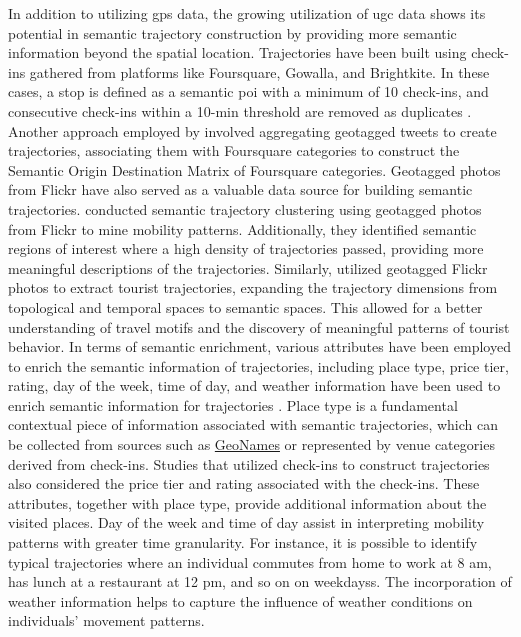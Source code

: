 \documentclass{article}
\theoremstyle{definition}
\theoremstyle{remark}
\begin{document}
In addition to utilizing \acrshort{gps} data, the growing utilization of \acrshort{ugc} data shows its potential in semantic trajectory construction by providing more semantic information beyond the spatial location. Trajectories have been built using check-ins gathered from platforms like Foursquare, Gowalla, and Brightkite. In these cases, a stop is defined as a semantic \acrshort{poi} with a minimum of 10 check-ins, and consecutive check-ins within a 10-min threshold are removed as duplicates \citep{petry_towards_2019,ferrero_mastermovelets_2020}. Another approach employed by \cite{nin_tweets_2014} involved aggregating geotagged tweets to create trajectories, associating them with Foursquare categories to construct the Semantic Origin Destination Matrix of Foursquare categories. Geotagged photos from Flickr have also served as a valuable data source for building semantic trajectories. \cite{cai_mining_2018} conducted semantic trajectory clustering using geotagged photos from Flickr to mine mobility patterns. Additionally, they identified semantic regions of interest where a high density of trajectories passed, providing more meaningful descriptions of the trajectories. Similarly, \cite{yang_quantifying_2017} utilized geotagged Flickr photos to extract tourist trajectories, expanding the trajectory dimensions from topological and temporal spaces to semantic spaces. This allowed for a better understanding of travel motifs and the discovery of meaningful patterns of tourist behavior. In terms of semantic enrichment, various attributes have been employed to enrich the semantic information of trajectories, including place type, price tier, rating, day of the week, time of day, and weather information have been used to enrich semantic information for trajectories \cite{cai_mining_2018,petry_towards_2019,liu_stccd_2020,ferrero_mastermovelets_2020}. Place type is a fundamental contextual piece of information associated with semantic trajectories, which can be collected from sources such as \href{http://www.geonames.org/}{GeoNames} or represented by venue categories derived from check-ins. Studies that utilized check-ins to construct trajectories also considered the price tier and rating associated with the check-ins. These attributes, together with place type, provide additional information about the visited places. Day of the week and time of day assist in interpreting mobility patterns with greater time granularity. For instance, it is possible to identify typical trajectories where an individual commutes from home to work at 8 am, has lunch at a restaurant at 12 pm, and so on on weekdayss. The incorporation of weather information helps to capture the influence of weather conditions on individuals' movement patterns.
\end{document}
